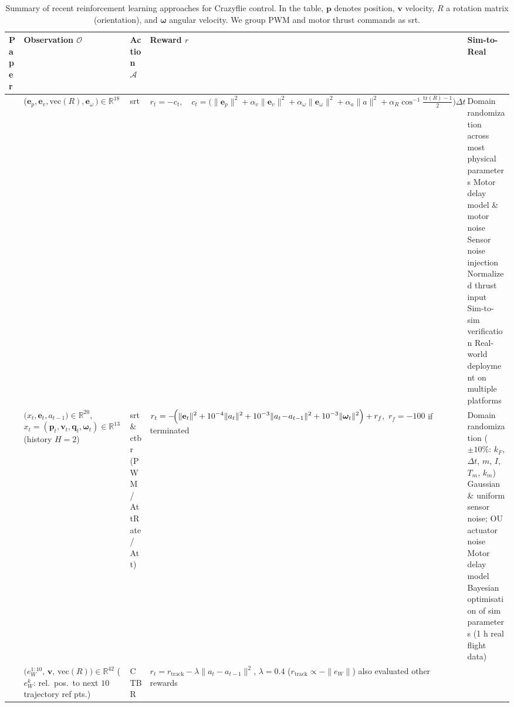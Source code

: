 \begin{table*}[!b]
  \centering
  \caption[Summary of RL approaches]{Summary of recent reinforcement learning approaches for Crazyflie control. In the table, $\mathbf{p}$ denotes position, $\mathbf{v}$ velocity, $R$ a rotation matrix (orientation), and $\boldsymbol{\omega}$ angular velocity. We group PWM and motor thrust commands as \gls{srt}.}
  \label{tab:rl_comparison}
  \scriptsize
  \begin{tabularx}{\textwidth}{p{0.7cm} p{3.0cm} p{1.3cm} p{3.5cm} X}
    \toprule
    \rowcolor{white}
    \textbf{Paper} & \textbf{Observation $\mathcal{O}$} & \textbf{Action $\mathcal{A}$} & \textbf{Reward $r$} & \textbf{Sim-to-Real} \\
    \midrule
    \cite{molchanov_sim--multi-real_2019} & 
    ($\mathbf e_p,\mathbf e_v,\mathrm{vec}(R),\mathbf e_\omega\,)\in\mathbb R^{18} $ & 
    \gls{srt}  & 
      \(\displaystyle
    r_t=-c_t,\quad
    c_t=\bigl(\|\mathbf e_p\|^2+\alpha_v\|\mathbf e_v\|^2+\alpha_\omega\|\mathbf e_\omega\|^2+\alpha_a\|a\|^2+\alpha_R\cos^{-1}\!\tfrac{\mathrm{tr}(R)-1}{2}\bigr)\Delta t
    \) 
    &
     Domain randomization across most physical parameters\newline
      Motor delay model \& motor noise\newline
      Sensor noise injection\newline
      Normalized thrust input\newline
      Sim-to-sim verification\newline
      Real-world deployment on multiple platforms  \\
    \cite{gronauer_using_2022} & 
    $\bigl(x_t,\mathbf{e}_t,a_{t-1}\bigr)\!\in\!\mathbb{R}^{20}$, \newline 
    $x_t=(\mathbf{p}_t,\mathbf{v}_t,\mathbf{q}_t,\boldsymbol{\omega}_t)\!\in\!\mathbb{R}^{13}$ \newline 
    (history $H{=}2$) & 
    \gls{srt} \& \gls{ctbr}\newline 
    (PWM / AttRate / Att) & 
    $\displaystyle r_t= -\!\Bigl(\|\mathbf{e}_t\|^{2} + 10^{-4}\|a_t\|^{2} + 10^{-3}\|a_t\!-\!a_{t-1}\|^{2} + 10^{-3}\|\boldsymbol{\omega}_t\|^{2}\Bigr) + r_f,$ \newline 
    $r_f = -100$ if terminated &
    Domain randomization ($\pm10\%$: $k_F$, $\Delta t$, $m$, $I$, $T_m$, $k_m$) \newline
    Gaussian \& uniform sensor noise; OU actuator noise \newline
    Motor delay model \newline
    Bayesian optimisation of sim parameters (1 h real flight data)\\
    \cite{chen_what_2024} & 
    $\bigl(e_W^{1:10},\,\mathbf v,\,\mathrm{vec}(R)\bigr)\!\in\!\mathbb R^{42}$
    ($e_W^{k}$: rel.\ pos.\ to next $10$ trajectory ref pts.) & 
    CTBR & 
    $r_t = r_{\text{track}} - \lambda\|a_t - a_{t-1}\|^2$, \; $\lambda=0.4$ \newline 
    ($r_{\text{track}} \propto -\|e_W\|$) \newline
    also evaluated other rewards
    & 
   

\end{tabularx}
\end{table*}
